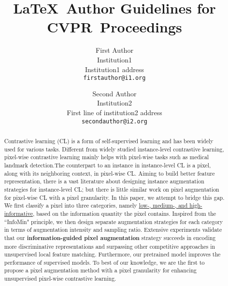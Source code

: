 \documentclass[10pt,twocolumn,letterpaper]{article}
\def\confName{CVPR}
\begin{document}
\title{\LaTeX\ Author Guidelines for \confName~Proceedings}

\author{First Author\\
Institution1\\
Institution1 address\\
{\tt\small firstauthor@i1.org}
\and
Second Author\\
Institution2\\
First line of institution2 address\\
{\tt\small secondauthor@i2.org}
}
\maketitle

\begin{abstract}
   Contrastive learning (CL) is a form of self-supervised learning and has been widely used for various tasks. Different from widely studied instance-level contrastive learning, pixel-wise contrastive learning mainly helps with pixel-wise tasks such as medical landmark detection.The counterpart to an instance in instance-level CL is a pixel, along with its neighboring context, in pixel-wise CL. Aiming to build better feature representation, there is a vast literature about designing instance augmentation strategies for instance-level CL; but there is little similar work on pixel augmentation for pixel-wise CL with a pixel granularity. In this paper, we attempt to bridge this gap. We first classify a pixel into three categories, namely \underline{low-, medium-, and high-informative}, based on the information quantity the pixel contains. Inspired from the ``InfoMin" principle, we then design separate augmentation strategies for each category in terms of augmentation intensity and sampling ratio. Extensive experiments validate that our \textbf{information-guided pixel augmentation} strategy succeeds in encoding more discriminative representations and surpassing other competitive approaches in unsupervised local feature matching. Furthermore, our pretrained model improves the performance of supervised models.
To best of our knowledge, we are the first to propose a pixel augmentation method with a pixel granularity for enhancing unsupervised pixel-wise contrastive learning.
\end{abstract}
\end{document}
